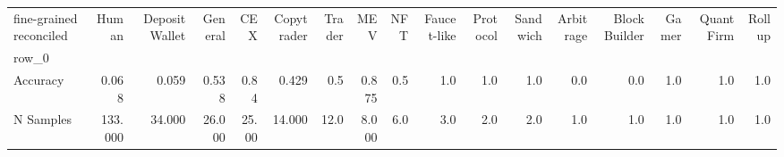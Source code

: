 \begin{tabular}{lrrrrrrrrrrrrrrrr}
\toprule
fine-grained reconciled &    Human &  Deposit Wallet &  General &    CEX &  Copytrader &  Trader &    MEV &  NFT &  Faucet-like &  Protocol &  Sandwich &  Arbitrage &  Block Builder &  Gamer &  Quant Firm &  Rollup \\
row\_0     &          &                 &          &        &             &         &        &      &              &           &           &            &                &        &             &         \\
\midrule
Accuracy  &    0.068 &           0.059 &    0.538 &   0.84 &       0.429 &     0.5 &  0.875 &  0.5 &          1.0 &       1.0 &       1.0 &        0.0 &            0.0 &    1.0 &         1.0 &     1.0 \\
N Samples &  133.000 &          34.000 &   26.000 &  25.00 &      14.000 &    12.0 &  8.000 &  6.0 &          3.0 &       2.0 &       2.0 &        1.0 &            1.0 &    1.0 &         1.0 &     1.0 \\
\bottomrule
\end{tabular}
